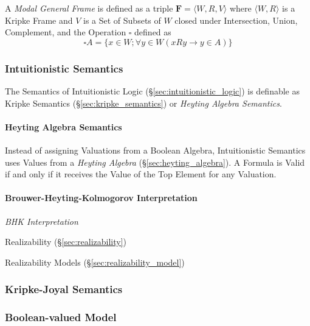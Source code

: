 A \emph{Modal General Frame} is defined as a triple $\mathbf{F} =
\langle W,R,V \rangle$ where $\langle W,R \rangle$ is a Kripke Frame
and $V$ is a Set of Subsets of $W$ closed under Intersection, Union,
Complement, and the Operation $\square$ defined as
\[
    \square A = \{x \in W; \forall y \in W ( x R y \rightarrow y \in A ) \}
\]



\subsubsection{Intuitionistic Semantics}
\label{sec:intuitionistic_semantics}

The Semantics of Intuitionistic Logic
(\S\ref{sec:intuitionistic_logic}) is definable as Kripke Semantics
(\S\ref{sec:kripke_semantics}) or \emph{Heyting Algebra Semantics}.



\paragraph{Heyting Algebra Semantics}\label{sec:heyting_semantics}\hfill

Instead of assigning Valuations from a Boolean Algebra, Intuitionistic
Semantics uses Values from a \emph{Heyting Algebra}
(\S\ref{sec:heyting_algebra}). A Formula is Valid if and only if it
receives the Value of the Top Element for any Valuation.



\paragraph{Brouwer-Heyting-Kolmogorov Interpretation}\hfill
\label{sec:brouwer_heyting_kolmogorov}

\emph{BHK Interpretation}

Realizability (\S\ref{sec:realizability})

Realizability Models (\S\ref{sec:realizability_model})



\subsubsection{Kripke-Joyal Semantics}\label{sec:kripke_joyal}

\subsubsection{Boolean-valued Model}\label{sec:boolean_model}

